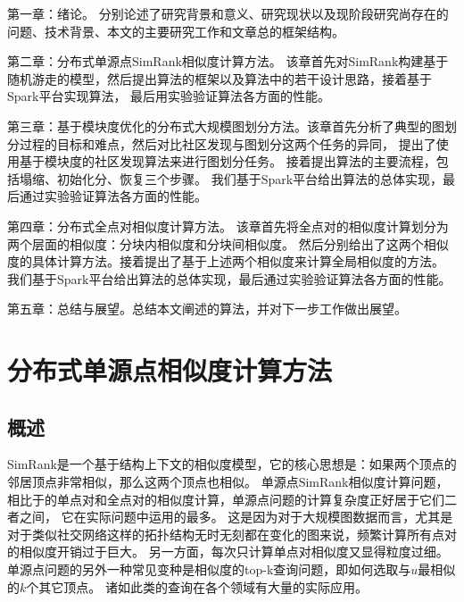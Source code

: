 \documentclass[master]{njuthesis}
\begin{document}
第一章：绪论。 分别论述了研究背景和意义、研究现状以及现阶段研究尚存在的问题、技术背景、本文的主要研究工作和文章总的框架结构。

第二章：分布式单源点SimRank相似度计算方法。 
该章首先对SimRank构建基于随机游走的模型，然后提出算法的框架以及算法中的若干设计思路，接着基于Spark平台实现算法，
最后用实验验证算法各方面的性能。

第三章：基于模块度优化的分布式大规模图划分方法。该章首先分析了典型的图划分过程的目标和难点，然后对比社区发现与图划分这两个任务的异同，
提出了使用基于模块度的社区发现算法来进行图划分任务。 接着提出算法的主要流程，包括塌缩、初始化分、恢复三个步骤。
我们基于Spark平台给出算法的总体实现，最后通过实验验证算法各方面的性能。

第四章：分布式全点对相似度计算方法。 该章首先将全点对的相似度计算划分为两个层面的相似度：分块内相似度和分块间相似度。
然后分别给出了这两个相似度的具体计算方法。接着提出了基于上述两个相似度来计算全局相似度的方法。
我们基于Spark平台给出算法的总体实现，最后通过实验验证算法各方面的性能。

第五章：总结与展望。总结本文阐述的算法，并对下一步工作做出展望。


\chapter{分布式单源点相似度计算方法}\label{chapter_sssSimRank}

\section{概述}
SimRank是一个基于结构上下文的相似度模型，它的核心思想是：如果两个顶点的邻居顶点非常相似，那么这两个顶点也相似。
单源点SimRank相似度计算问题，相比于的单点对和全点对的相似度计算，单源点问题的计算复杂度正好居于它们二者之间，
它在实际问题中运用的最多。
这是因为对于大规模图数据而言，尤其是对于类似社交网络这样的拓扑结构无时无刻都在变化的图来说，频繁计算所有点对的相似度开销过于巨大。
另一方面，每次只计算单点对相似度又显得粒度过细。
单源点问题的另外一种常见变种是相似度的top\string-k查询问题，即如何选取与$u$最相似的$k$个其它顶点。
诸如此类的查询在各个领域有大量的实际应用。
\end{document}
